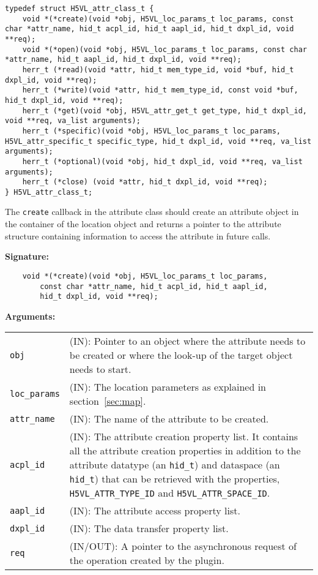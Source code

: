 \begin{lstlisting}
typedef struct H5VL_attr_class_t {
    void *(*create)(void *obj, H5VL_loc_params_t loc_params, const char *attr_name, hid_t acpl_id, hid_t aapl_id, hid_t dxpl_id, void **req);
    void *(*open)(void *obj, H5VL_loc_params_t loc_params, const char *attr_name, hid_t aapl_id, hid_t dxpl_id, void **req);
    herr_t (*read)(void *attr, hid_t mem_type_id, void *buf, hid_t dxpl_id, void **req);
    herr_t (*write)(void *attr, hid_t mem_type_id, const void *buf, hid_t dxpl_id, void **req);
    herr_t (*get)(void *obj, H5VL_attr_get_t get_type, hid_t dxpl_id, void **req, va_list arguments);
    herr_t (*specific)(void *obj, H5VL_loc_params_t loc_params, H5VL_attr_specific_t specific_type, hid_t dxpl_id, void **req, va_list arguments);
    herr_t (*optional)(void *obj, hid_t dxpl_id, void **req, va_list arguments);
    herr_t (*close) (void *attr, hid_t dxpl_id, void **req);
} H5VL_attr_class_t;
\end{lstlisting}

The {\tt create} callback in the attribute class should create an
attribute object in the container of the location object and
returns a pointer to the attribute structure containing information to
access the attribute in future calls. 

\textbf{Signature:}
\begin{lstlisting}
    void *(*create)(void *obj, H5VL_loc_params_t loc_params, 
        const char *attr_name, hid_t acpl_id, hid_t aapl_id, 
        hid_t dxpl_id, void **req);
\end{lstlisting}

\textbf{Arguments:}\\
\begin{tabular}{l p{10cm}}
  {\tt obj} & (IN): Pointer to an object where the attribute needs
  to be created or where the look-up of the target object needs to
  start.\\
  {\tt loc\_params} & (IN): The location parameters as explained in
  section~\ref{sec:map}.\\
  {\tt attr\_name} & (IN): The name of the attribute to be created.\\
  {\tt acpl\_id} & (IN): The attribute creation property list. It contains
  all the attribute creation properties in addition to the attribute
  datatype (an {\tt hid\_t}) and dataspace (an {\tt hid\_t}) that can
  be retrieved with the properties, {\tt H5VL\_ATTR\_TYPE\_ID} and
  {\tt H5VL\_ATTR\_SPACE\_ID}.\\
  {\tt aapl\_id} & (IN): The attribute access property list.\\
  {\tt dxpl\_id} & (IN): The data transfer property list.\\
  {\tt req} & (IN/OUT): A pointer to the asynchronous request of the
  operation created by the plugin.\\
\end{tabular}

